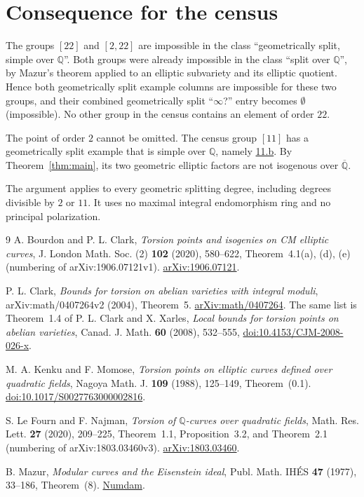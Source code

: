 \documentclass[11pt]{article}
\theoremstyle{remark}
\newcommand{\Q}{\mathbb Q}
\begin{document}
\section{Consequence for the census}

The groups
\href{https://genus-2-torsion.github.io/group.html?g=22}{\([22]\)} and
\href{https://genus-2-torsion.github.io/group.html?g=2.22}{\([2,22]\)}
are impossible in the class ``geometrically split, simple over
\(\Q\)''. Both groups were already impossible in the class ``split over
\(\Q\)'', by Mazur's theorem applied to an elliptic subvariety and its
elliptic quotient. Hence both geometrically split example columns are
impossible for these two groups, and their combined geometrically split
``\(\infty\)?'' entry becomes \(\emptyset\) (impossible). No other
group in the census contains an element of order \(22\).

The point of order \(2\) cannot be omitted. The census group
\href{https://genus-2-torsion.github.io/group.html?g=11}{\([11]\)} has
a geometrically split example that is simple over \(\Q\), namely
\href{https://genus-2-torsion.github.io/curve.html?id=11.b}{11.b}. By
Theorem~\ref{thm:main}, its two geometric elliptic factors are not
isogenous over \(\overline{\Q}\).

The argument applies to every geometric splitting degree, including
degrees divisible by \(2\) or \(11\). It uses no maximal integral
endomorphism ring and no principal polarization.

\begin{thebibliography}{9}
A. Bourdon and P. L. Clark,
\emph{Torsion points and isogenies on CM elliptic curves},
J. London Math. Soc. (2) \textbf{102} (2020), 580--622,
Theorem~4.1(a), (d), (e) (numbering of arXiv:1906.07121v1).
\href{https://arxiv.org/pdf/1906.07121}{arXiv:1906.07121}.

P. L. Clark,
\emph{Bounds for torsion on abelian varieties with integral moduli},
arXiv:math/0407264v2 (2004), Theorem~5.
\href{https://arxiv.org/pdf/math/0407264}{arXiv:math/0407264}.
The same list is Theorem~1.4 of P. L. Clark and X. Xarles, \emph{Local bounds for torsion points on abelian varieties}, Canad. J. Math. \textbf{60} (2008), 532--555, \href{https://doi.org/10.4153/CJM-2008-026-x}{doi:10.4153/CJM-2008-026-x}.

M. A. Kenku and F. Momose,
\emph{Torsion points on elliptic curves defined over quadratic fields},
Nagoya Math. J. \textbf{109} (1988), 125--149, Theorem~(0.1).
\href{https://doi.org/10.1017/S0027763000002816}{doi:10.1017/S0027763000002816}.

S. Le Fourn and F. Najman,
\emph{Torsion of \(\Q\)-curves over quadratic fields},
Math. Res. Lett. \textbf{27} (2020), 209--225, Theorem~1.1,
Proposition~3.2, and Theorem~2.1 (numbering of arXiv:1803.03460v3).
\href{https://arxiv.org/pdf/1803.03460}{arXiv:1803.03460}.

B. Mazur,
\emph{Modular curves and the Eisenstein ideal},
Publ. Math. IH\'ES \textbf{47} (1977), 33--186, Theorem~(8).
\href{https://www.numdam.org/item/PMIHES_1977__47__33_0/}{Numdam}.
\end{thebibliography}
\end{document}
